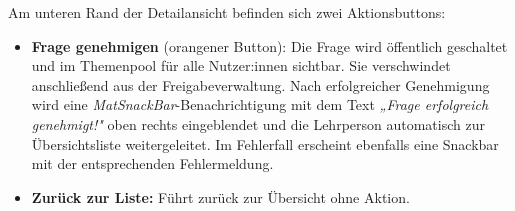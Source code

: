 Am unteren Rand der Detailansicht befinden sich zwei Aktionsbuttons:

\begin{itemize}
    \item \textbf{Frage genehmigen} (orangener Button): Die Frage wird öffentlich
    geschaltet und im Themenpool für alle Nutzer:innen sichtbar. Sie verschwindet
    anschließend aus der Freigabeverwaltung. Nach erfolgreicher Genehmigung wird
    eine \textit{MatSnackBar}-Benachrichtigung mit dem Text
    \textit{„Frage erfolgreich genehmigt!"} oben rechts eingeblendet und die
    Lehrperson automatisch zur Übersichtsliste weitergeleitet. Im Fehlerfall
    erscheint ebenfalls eine Snackbar mit der entsprechenden Fehlermeldung.
    \item \textbf{Zurück zur Liste:} Führt zurück zur Übersicht ohne Aktion.
\end{itemize}